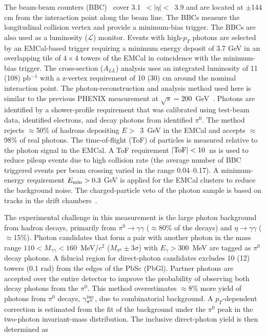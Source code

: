 \documentclass[twocolumn,letterpaper,aps,prl,longbibliography,superscriptaddress,floatfix]{revtex4-2}
\newcommand{\pT}{\mbox{$p_T$}\xspace}
\newcommand{\pizero}{\mbox{$\pi^0$}\xspace}
\newcommand{\ALL}{\mbox{$A_{LL}$}\xspace}
\begin{document}
The beam-beam counters (BBC)~\cite{ALLEN2003549} cover \mbox{3.1 $<
|\eta| <$ 3.9} and are located at $\pm$144 cm from the interaction point 
along the beam line. The BBCs measure the longitudinal collision vertex 
and provide a minimum-bias trigger. The BBCs are also used as 
a luminosity ($\mathcal{L}$) monitor. Events with high-\pT photons are selected by an 
EMCal-based trigger requiring a minimum energy deposit of 3.7 GeV in an 
overlapping tile of $4{\times}4$ towers of the EMCal in coincidence with 
the minimum-bias trigger. The cross-section (\ALL) analysis uses an 
integrated luminosity of 11 (108) pb$^{-1}$ with a 
z-vertex requirement of 10 (30) cm around the nominal interaction point. 
The photon-reconstruction and analysis method used here is 
similar to the previous PHENIX measurement at 
$\sqrt{s}=200$~GeV~\cite{PhysRevLett.98.012002,PhysRevD.86.072008}. 
Photons are identified by a shower-profile requirement that was 
calibrated using test-beam data, identified electrons, and decay photons 
from identified \pizero. The method rejects $\approx$50\% of hadrons 
depositing \mbox{$E>$ 3 GeV} in the EMCal and accepts $\approx$98\% of 
real photons. The time-of-flight (ToF) of particles is measured relative 
to the photon signal in the EMCal.  A ToF requirement 
$|{\rm ToF}|<10$~ns is used to reduce pileup events due to high 
collision rate (the average number of BBC triggered events per beam 
crossing varied in the range 0.04--0.17). A minimum-energy requirement 
$E_{\rm min}>0.3$ GeV is applied for the EMCal clusters to reduce the 
background noise.  The charged-particle veto of the photon sample is 
based on tracks in the drift chambers~\cite{ADCOX2003489}.


The experimental challenge in this measurement is the large photon 
background from hadron decays, primarily from 
$\pi^0 \rightarrow \gamma\gamma$ ($\approx$80\% of the decays) 
and $\eta \rightarrow 
\gamma\gamma$ ($\approx$15\%). Photon candidates that form a pair with 
another photon in the mass range 
$110<M_{\gamma\gamma}<160$~MeV/c$^2$ ($M_{\pi^0}{\pm}3\sigma$) 
with $E_{\gamma}>300$~MeV are 
tagged as \pizero decay photons. A fiducial region for direct-photon 
candidates excludes 10 (12) towers (0.1 rad) from the edges of the PbSc 
(PbGl). Partner photons are accepted over the entire detector to 
improve the probability of observing both decay photons from the 
\pizero.  This method overestimates $\approx$8\% more yield of photons 
from \pizero decays, $\gamma_{\pi^0}^{{\rm inc}}$, due to combinatorial 
background. A \pT-dependent correction is estimated from the fit of the 
background under the \pizero peak in the two-photon invariant-mass 
distribution. The inclusive direct-photon yield is then determined as
\end{document}
